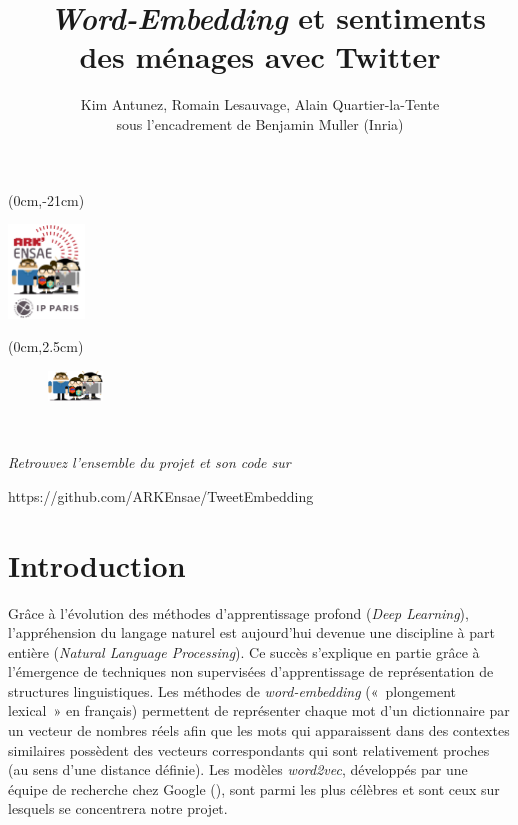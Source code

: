 \documentclass[11pt,french,french]{article}
\title{~\emph{Word-Embedding} et sentiments des ménages avec Twitter}
\author{Kim Antunez, Romain Lesauvage, Alain Quartier-la-Tente\\
sous l'encadrement de Benjamin Muller (Inria)}
\date{}
\begin{document}
\maketitle


{
\hypersetup{linkcolor=black}
\setcounter{tocdepth}{2}
\tableofcontents
}
\begin{textblock*}{\textwidth}(0cm,-21cm)
\begin{center}
\includegraphics[height=2.5cm]{img/LOGO-ENSAE.png}
\end{center}
\end{textblock*}

\begin{textblock*}{\textwidth}(0cm,2.5cm)
\begin{center}
\begin{minipage}{0.7\textwidth}

\begin{figure}
\includegraphics[height=0.8cm]{img/avatars.png}
\end{figure}

$\phantom{saut}$

\emph{Retrouvez l'ensemble du projet et son code sur}

https://github.com/ARKEnsae/TweetEmbedding

\end{minipage}
\end{center}

\end{textblock*}

\newpage 

\section*{Introduction}\label{introduction}

Grâce à l'évolution des méthodes d'apprentissage profond (\emph{Deep
Learning}), l'appréhension du langage naturel est aujourd'hui devenue
une discipline à part entière (\emph{Natural Language Processing}). Ce
succès s'explique en partie grâce à l'émergence de techniques non
supervisées d'apprentissage de représentation de structures
linguistiques. Les méthodes de \emph{word-embedding} («~plongement
lexical~» en français) permettent de représenter chaque mot d'un
dictionnaire par un vecteur de nombres réels afin que les mots qui
apparaissent dans des contextes similaires possèdent des vecteurs
correspondants qui sont relativement proches (au sens d'une distance
définie). Les modèles \emph{word2vec}, développés par une équipe de
recherche chez Google (\cite{Mikolov}), sont parmi les plus célèbres et
sont ceux sur lesquels se concentrera notre projet.
\end{document}
